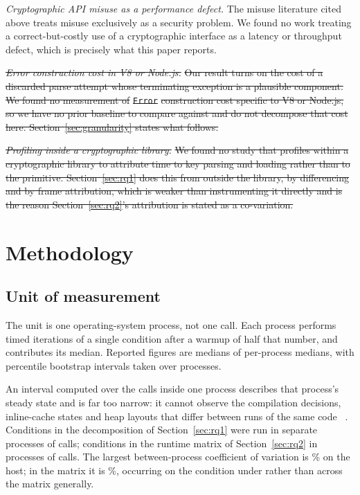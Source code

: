 \documentclass[pdflatex,sn-basic,twocolumn]{sn-jnl}%
\providecommand{\DIFdel}[1]{{\protect\color{red}\sout{#1}}}                      %
\providecommand{\DIFaddbegin}{} %
\providecommand{\DIFaddend}{} %
\providecommand{\DIFdelbegin}{} %
\providecommand{\DIFdelend}{} %
\newcommand{\DIFscaledelfig}{0.5}
\newlength{\DIFdelgraphicswidth} %
\newlength{\DIFdelgraphicsheight} %
\newcommand{\DIFaddincludegraphics}[2][]{{\color{blue}\fbox{\DIFOincludegraphics[#1]{#2}}}} %
\newcommand{\DIFdelincludegraphics}[2][]{%
\sbox{\DIFdelgraphicsbox}{\DIFOincludegraphics[#1]{#2}}%
\settoboxwidth{\DIFdelgraphicswidth}{\DIFdelgraphicsbox} %
\settoboxtotalheight{\DIFdelgraphicsheight}{\DIFdelgraphicsbox} %
\scalebox{\DIFscaledelfig}{%
\parbox[b]{\DIFdelgraphicswidth}{\usebox{\DIFdelgraphicsbox}\\[-\baselineskip] \rule{\DIFdelgraphicswidth}{0em}}\llap{\resizebox{\DIFdelgraphicswidth}{\DIFdelgraphicsheight}{%
\setlength{\unitlength}{\DIFdelgraphicswidth}%
\begin{picture}(1,1)%
\thicklines\linethickness{2pt} %
{\color[rgb]{1,0,0}\put(0,0){\framebox(1,1){}}}%
{\color[rgb]{1,0,0}\put(0,0){\line( 1,1){1}}}%
{\color[rgb]{1,0,0}\put(0,1){\line(1,-1){1}}}%
\end{picture}%
}\hspace*{3pt}}} %
} %
\DeclareRobustCommand{\DIFaddbegin}{\DIFOaddbegin \let\includegraphics\DIFaddincludegraphics} %
\DeclareRobustCommand{\DIFaddend}{\DIFOaddend \let\includegraphics\DIFOincludegraphics} %
\DeclareRobustCommand{\DIFdelbegin}{\DIFOdelbegin \let\includegraphics\DIFdelincludegraphics} %
\DeclareRobustCommand{\DIFdelend}{\DIFOaddend \let\includegraphics\DIFOincludegraphics} %
\begin{document}
\emph{Cryptographic API misuse as a performance defect.} The misuse literature
cited above treats misuse exclusively as a security problem. We found no work
treating a correct-but-costly use of a cryptographic interface as a latency or
throughput defect, which is precisely what this paper reports.

\DIFdelbegin \emph{\DIFdel{Error construction cost in V8 or Node.js.}} %
\DIFdel{Our result turns on the cost of
a discarded parse attempt whose terminating exception is a plausible component.
We found no measurement of }\texttt{\DIFdel{Error}} %
\DIFdel{construction cost specific to V8 or
Node.js, so we have no prior baseline to compare against and do not decompose
that cost here. Section~\ref{sec:granularity} states what follows.
}%

\emph{\DIFdel{Profiling inside a cryptographic library.}} %
\DIFdel{We found no study that profiles
within a cryptographic library to attribute time to key parsing and loading
rather than to the primitive. Section~\ref{sec:rq1} does this from outside the
library, by differencing and by frame attribution, which is weaker than
instrumenting it directly and is the reason Section~\ref{sec:rq2}'s attribution
is stated as a co-variation.
}%

\DIFdelend %
\section{Methodology}\label{sec:method}

\subsection{Unit of measurement}\label{sec:unit}

The unit is one operating-system process, not one call. Each process performs
\HostCallsPerInvocation{} timed iterations of a single condition after a warmup
of half that number, and contributes its median. Reported figures are medians of
per-process medians, with percentile bootstrap intervals taken over processes.

An interval computed over the calls inside one process describes that process's
steady state and is far too narrow: it cannot observe the compilation decisions,
inline-cache states and heap layouts that differ between runs of the same
code~\DIFdelbegin %
\DIFdelend \DIFaddbegin \citep{georges2007statistically}\DIFaddend . Conditions in the decomposition of
Section~\ref{sec:rq1} were run in \HostInvocations{} separate processes of
\HostCallsPerInvocation{} calls; conditions in the runtime matrix of
Section~\ref{sec:rq2} in \MatrixInvocations{} processes of
\MatrixCallsPerInvocation{} calls. The largest between-process coefficient of
variation is \HostCvMax\% on the host; in the matrix it is \MatrixCvMax\%,
occurring on the \MatrixCvMaxCondition{} condition under
\MatrixCvMaxEnvironment{} rather than across the matrix generally.
\end{document}

